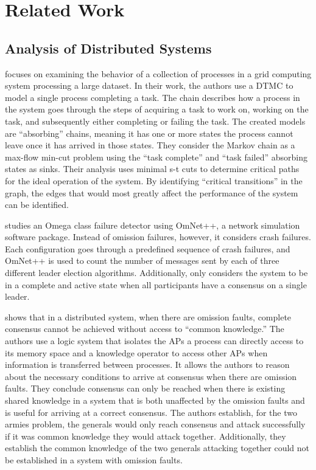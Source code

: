 

\chapter{Related Work}

\section{Analysis of Distributed Systems}

\cite{markov-distributed} focuses on examining the behavior of a collection of processes in a grid computing system processing a large dataset.
In their work, the authors use a \ac{DTMC} to model a single process completing a task.
The chain describes how a process in the system goes through the steps of acquiring a task to work on, working on the task, and subsequently either completing or failing the task.
The created models are ``absorbing'' chains, meaning it has one or more states the process cannot leave once it has arrived in those states.
They consider the Markov chain as a max-flow min-cut problem using the ``task complete'' and ``task failed'' absorbing states as sinks.
Their analysis uses minimal s-t cuts to determine critical paths for the ideal operation of the system.
By identifying ``critical transitions'' in the graph, the edges that would most greatly affect the performance of the system can be identified.

\cite{LEADERELECTIONEVAL} studies an Omega class failure detector using OmNet++\cite{OMNET}, a network simulation software package.
Instead of omission failures, however, it considers crash failures.
Each configuration goes through a predefined sequence of crash failures, and OmNet++ is used to count the number of messages sent by each of three different leader election algorithms.
Additionally, \cite{LEADERELECTIONEVAL} only considers the system to be in a complete and active state when all participants have a consensus on a single leader.

\cite{knowledge-distributed} shows that in a distributed system, when there are omission faults, complete consensus cannot be achieved without access to ``common knowledge.''
The authors use a logic system that isolates the \acp{AP} a process can directly access to its memory space and a knowledge operator to access other \acp{AP} when information is transferred between processes.
It allows the authors to reason about the necessary conditions to arrive at consensus when there are omission faults.
They conclude consensus can only be reached when there is existing shared knowledge in a system that is both unaffected by the omission faults and is useful for arriving at a correct consensus.
The authors establish, for the two armies problem, the generals would only reach consensus and attack successfully if it was common knowledge they would attack together.
Additionally, they establish the common knowledge of the two generals attacking together could not be established in a system with omission faults.

